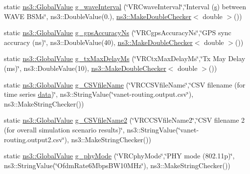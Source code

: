 \begin{DoxyCompactItemize}
\item 
static \hyperlink{classns3_1_1GlobalValue}{ns3\+::\+Global\+Value} \hyperlink{vanet-routing-compare_8cc_a27f3f3442407dc38d5a31a37053fb536}{g\+\_\+wave\+Interval} (\char`\"{}V\+R\+Cwave\+Interval\char`\"{},\char`\"{}Interval (\hyperlink{generate__test__data__lte__sinr_8m_ad83eeb3a142285d1243a08c6b7026df8}{s}) between W\+A\+VE B\+S\+Ms\char`\"{}, ns3\+::\+Double\+Value(0.), \hyperlink{namespacens3_a0f8000e7b66dd988358648f0b16c7709}{ns3\+::\+Make\+Double\+Checker}$<$ double $>$())
\item 
static \hyperlink{classns3_1_1GlobalValue}{ns3\+::\+Global\+Value} \hyperlink{vanet-routing-compare_8cc_a4ee42facf395ec37f1603f17006d2a2b}{g\+\_\+gps\+Accuracy\+Ns} (\char`\"{}V\+R\+Cgps\+Accuracy\+Ns\char`\"{},\char`\"{}G\+PS sync accuracy (ns)\char`\"{}, ns3\+::\+Double\+Value(40), \hyperlink{namespacens3_a0f8000e7b66dd988358648f0b16c7709}{ns3\+::\+Make\+Double\+Checker}$<$ double $>$())
\item 
static \hyperlink{classns3_1_1GlobalValue}{ns3\+::\+Global\+Value} \hyperlink{vanet-routing-compare_8cc_a309f830b17d86d0b16859c64e952567e}{g\+\_\+tx\+Max\+Delay\+Ms} (\char`\"{}V\+R\+Ctx\+Max\+Delay\+Ms\char`\"{},\char`\"{}Tx May Delay (ms)\char`\"{}, ns3\+::\+Double\+Value(10), \hyperlink{namespacens3_a0f8000e7b66dd988358648f0b16c7709}{ns3\+::\+Make\+Double\+Checker}$<$ double $>$())
\item 
static \hyperlink{classns3_1_1GlobalValue}{ns3\+::\+Global\+Value} \hyperlink{vanet-routing-compare_8cc_a7a349a584116d7e5f584147913d8cd42}{g\+\_\+\+C\+S\+Vfile\+Name} (\char`\"{}V\+R\+C\+C\+S\+Vfile\+Name\char`\"{},\char`\"{}C\+SV filename (for time series \hyperlink{topology-example-sim_8cc_a26c65296e316af77b787dc77469bb2a4}{data})\char`\"{}, ns3\+::\+String\+Value(\char`\"{}vanet-\/routing.\+output.\+csv\char`\"{}), ns3\+::\+Make\+String\+Checker())
\item 
static \hyperlink{classns3_1_1GlobalValue}{ns3\+::\+Global\+Value} \hyperlink{vanet-routing-compare_8cc_ae5fc8882d794b8f5c71805e05e1b8e01}{g\+\_\+\+C\+S\+Vfile\+Name2} (\char`\"{}V\+R\+C\+C\+S\+Vfile\+Name2\char`\"{},\char`\"{}C\+SV filename 2 (for overall simulation scenario results)\char`\"{}, ns3\+::\+String\+Value(\char`\"{}vanet-\/routing.\+output2.\+csv\char`\"{}), ns3\+::\+Make\+String\+Checker())
\item 
static \hyperlink{classns3_1_1GlobalValue}{ns3\+::\+Global\+Value} \hyperlink{vanet-routing-compare_8cc_adf66bd1a75ed969cfa7d1f401bc748e5}{g\+\_\+phy\+Mode} (\char`\"{}V\+R\+Cphy\+Mode\char`\"{},\char`\"{}P\+HY mode (802.\+11p)\char`\"{}, ns3\+::\+String\+Value(\char`\"{}\+Ofdm\+Rate6\+Mbps\+B\+W10\+M\+Hz\char`\"{}), ns3\+::\+Make\+String\+Checker())

\end{DoxyCompactItemize}
